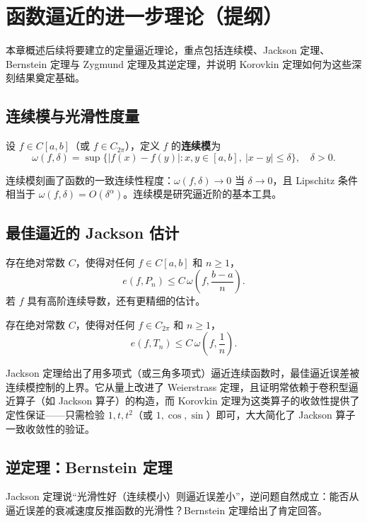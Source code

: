 \section{函数逼近的进一步理论（提纲）}

本章概述后续将要建立的定量逼近理论，重点包括连续模、Jackson 定理、Bernstein 定理与 Zygmund 定理及其逆定理，并说明 Korovkin 定理如何为这些深刻结果奠定基础。

\subsection{连续模与光滑性度量}
\begin{definition}[连续模]
设 $f\in C[a,b]$（或 $f\in C_{2\pi}$），定义 $f$ 的\textbf{连续模}为
\[
\omega(f,\delta) = \sup\{ |f(x)-f(y)| : x,y\in[a,b],\ |x-y|\le\delta \},\quad \delta>0.
\]
\end{definition}
连续模刻画了函数的一致连续性程度：$\omega(f,\delta)\to 0$ 当 $\delta\to0$，且 Lipschitz 条件相当于 $\omega(f,\delta)=O(\delta^\alpha)$。连续模是研究逼近阶的基本工具。

\subsection{最佳逼近的 Jackson 估计}
\begin{theorem}
存在绝对常数 $C$，使得对任何 $f\in C[a,b]$ 和 $n\ge1$，
\[
e(f,P_n) \le C\,\omega\!\left(f,\frac{b-a}{n}\right).
\]
若 $f$ 具有高阶连续导数，还有更精细的估计。
\end{theorem}

\begin{theorem}
存在绝对常数 $C$，使得对任何 $f\in C_{2\pi}$ 和 $n\ge1$，
\[
e(f,T_n) \le C\,\omega\!\left(f,\frac{1}{n}\right).
\]
\end{theorem}

Jackson 定理给出了用多项式（或三角多项式）逼近连续函数时，最佳逼近误差被连续模控制的上界。它从量上改进了 Weierstrass 定理，且证明常依赖于卷积型逼近算子（如 Jackson 算子）的构造，而 Korovkin 定理为这类算子的收敛性提供了定性保证——只需检验 $1,t,t^2$（或 $1,\cos,\sin$）即可，大大简化了 Jackson 算子一致收敛性的验证。

\subsection{逆定理：Bernstein 定理}
Jackson 定理说“光滑性好（连续模小）则逼近误差小”，逆问题自然成立：能否从逼近误差的衰减速度反推函数的光滑性？Bernstein 定理给出了肯定回答。


